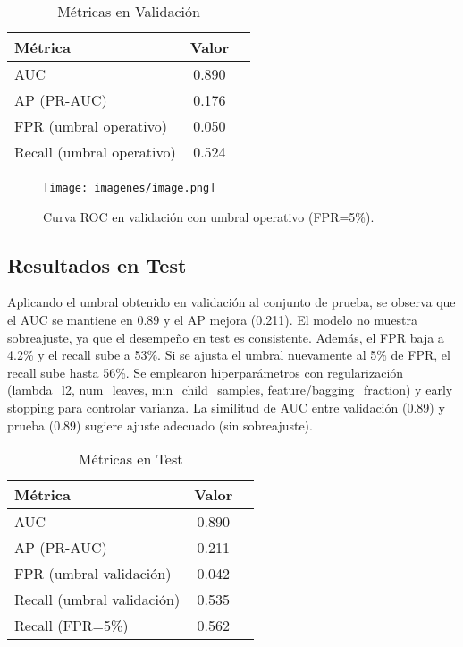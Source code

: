 \documentclass[runningheads]{llncs}
\begin{document}
\begin{table}[!ht]
\centering
\caption{Métricas en Validación}
\label{tab:val_metrics}
\begin{tabular}{lcc}
\toprule
Métrica & Valor \\
\midrule
AUC & 0.890 \\
AP (PR-AUC) & 0.176 \\
FPR (umbral operativo) & 0.050 \\
Recall (umbral operativo) & 0.524 \\
\bottomrule
\end{tabular}
\end{table}

\begin{figure}[!ht]
    \centering
    \texttt{[image: imagenes/image.png]}
    \caption{Curva ROC en validación con umbral operativo (FPR=5\%).}
    \label{fig:roc_val}
\end{figure}

\subsection{Resultados en Test}
Aplicando el umbral obtenido en validación al conjunto de prueba, se observa que el AUC se mantiene en 0.89 y el AP mejora (0.211). 
El modelo no muestra sobreajuste, ya que el desempeño en test es consistente. 
Además, el FPR baja a 4.2\% y el recall sube a 53\%. 
Si se ajusta el umbral nuevamente al 5\% de FPR, el recall sube hasta 56\%.
Se emplearon hiperparámetros con regularización (lambda\_l2, num\_leaves, min\_child\_samples, feature/bagging\_fraction) y early stopping para controlar varianza. 
La similitud de AUC entre validación (0.89) y prueba (0.89) sugiere ajuste adecuado (sin sobreajuste).

\begin{table}[!ht]
\centering
\caption{Métricas en Test}
\label{tab:test_metrics}
\begin{tabular}{lcc}
\toprule
Métrica & Valor \\
\midrule
AUC & 0.890 \\
AP (PR-AUC) & 0.211 \\
FPR (umbral validación) & 0.042 \\
Recall (umbral validación) & 0.535 \\
Recall (FPR=5\%) & 0.562 \\
\bottomrule
\end{tabular}
\end{table}
\end{document}
